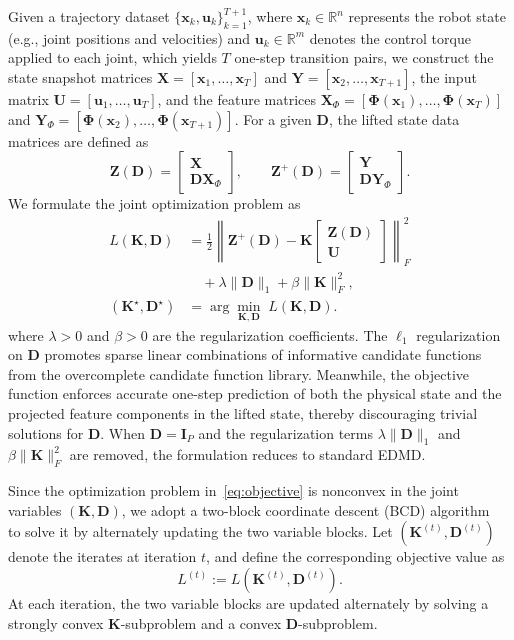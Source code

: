 \documentclass[letterpaper,10pt,conference]{ieeeconf}
\newcommand{\R}{\mathbb{R}}
\newcommand{\x}{\mathbf{x}}
\newcommand{\uvec}{\mathbf{u}}
\newcommand{\Kmat}{\mathbf{K}}
\newcommand{\Dmat}{\mathbf{D}}
\newcommand{\I}{\mathbf{I}}
\newcommand{\Zmat}{\mathbf{Z}}
\newcommand{\Umat}{\mathbf{U}}
\newcommand{\X}{\mathbf{X}}
\newcommand{\Y}{\mathbf{Y}}
\newcommand{\Phib}{\boldsymbol{\Phi}}
\newcommand{\XPhi}{\mathbf{X}_{\Phi}}
\newcommand{\YPhi}{\mathbf{Y}_{\Phi}}
\begin{document}
Given a trajectory dataset $\{\x_k, \uvec_k\}_{k=1}^{T+1}$, where $\x_k \in \R^n$ represents the robot state (e.g., joint positions and velocities) and $\uvec_k \in \R^m$ denotes the control torque applied to each joint, which yields $T$ one-step transition pairs, we construct the state snapshot matrices $\X = [\x_1, \dots, \x_T]$ and $\Y = [\x_2, \dots, \x_{T+1}]$, the input matrix $\Umat = [\uvec_1, \dots, \uvec_T]$, and the feature matrices $\XPhi = [\Phib(\x_1), \dots, \Phib(\x_T)]$ and $\YPhi = [\Phib(\x_2), \dots, \Phib(\x_{T+1})]$. For a given $\Dmat$, the lifted state data matrices are defined as
\begin{equation}
\Zmat(\Dmat) =
\begin{bmatrix}
\X \\ \Dmat \XPhi
\end{bmatrix}, \qquad
\Zmat^+(\Dmat) =
\begin{bmatrix}
\Y \\ \Dmat \YPhi
\end{bmatrix}.
\end{equation}
We formulate the joint optimization problem as
\begin{equation}
\label{eq:objective}
\begin{aligned}
L(\Kmat,\Dmat) &= \frac{1}{2}
\left\|
\Zmat^+(\Dmat) - \Kmat
\begin{bmatrix}
\Zmat(\Dmat) \\ \Umat
\end{bmatrix}
\right\|_F^2 \\
&\quad + \lambda\|\Dmat\|_1 + \beta\|\Kmat\|_F^2, \\
(\Kmat^\star, \Dmat^\star) &= \arg\min_{\Kmat,\Dmat} \; L(\Kmat,\Dmat).
\end{aligned}
\end{equation}
where $\lambda>0$ and $\beta>0$ are the regularization coefficients. The $\ell_1$ regularization on $\Dmat$ promotes sparse linear combinations of informative candidate functions from the overcomplete candidate function library. Meanwhile, the objective function enforces accurate one-step prediction of both the physical state and the projected feature components in the lifted state, thereby discouraging trivial solutions for $\Dmat$. When $\Dmat = \I_P$ and the regularization terms $\lambda\|\Dmat\|_1$ and $\beta\|\Kmat\|_F^2$ are removed, the formulation reduces to standard EDMD.

Since the optimization problem in~\eqref{eq:objective} is nonconvex in
the joint variables $(\Kmat,\Dmat)$, we adopt a two-block coordinate
descent (BCD) algorithm~\cite{Tseng2001} to solve it by alternately
updating the two variable blocks. Let $(\Kmat^{(t)},\Dmat^{(t)})$
denote the iterates at iteration $t$, and define the corresponding objective value as
\[
L^{(t)} := L(\Kmat^{(t)},\Dmat^{(t)}).
\]
At each iteration, the two variable blocks are updated alternately by solving a strongly convex $\Kmat$-subproblem and a convex $\Dmat$-subproblem.
\end{document}
